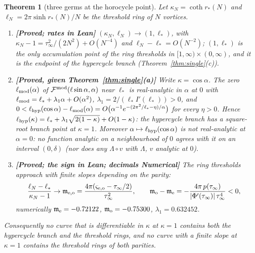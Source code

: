 \documentclass[11pt]{article}
\newtheorem{theorem}{Theorem}[section]
\theoremstyle{definition}
\theoremstyle{remark}
\newcommand{\st}[1]{\textbf{[#1]}}
\begin{document}
\begin{theorem}[three germs at the horocycle point]\label{thm:corner}
Let $\kappa_N=\coth r_*(N)$ and $\ell_N=2\pi\sinh r_*(N)/N$ be the threshold ring of $N$ vortices.
\begin{enumerate}
\item[(a)] \st{Proved; rates in Lean} $(\kappa_N,\ell_N)\to(1,\ell_*)$, with $\kappa_N-1=\tau_\infty^2/(2N^2)+O(N^{-4})$ and
$\ell_N-\ell_*=O(N^{-2})$; $(1,\ell_*)$ is the only accumulation point of the ring thresholds in $[1,\infty)\times(0,\infty)$, and it is
the endpoint of the hypercycle branch (Theorem~\ref{thm:single}(c)).
\item[(b)] \st{Proved, given Theorem~\ref{thm:single}(a)} Write $\kappa=\cos\alpha$. The zero $\ell_{\rm mod}(\alpha)$ of
$\mathcal F^{\rm mod}(\ell\sin\alpha,\alpha)$ near $\ell_*$ is real-analytic in $\alpha$ at $0$ with
$\ell_{\rm mod}=\ell_*+\lambda_1\alpha+O(\alpha^2)$, $\lambda_1=2/(\ell_*I'(\ell_*))>0$, and
$0<\ell_{\rm hyp}(\cos\alpha)-\ell_{\rm mod}(\alpha)=O\big(\alpha^{-1}e^{-(2\pi^2/\ell_*-\eta)/\alpha}\big)$ for every $\eta>0$. Hence
$\ell_{\rm hyp}(\kappa)=\ell_*+\lambda_1\sqrt{2(1-\kappa)}+O(1-\kappa)$: the hypercycle branch has a square-root branch point at $\kappa=1$.
Moreover $\alpha\mapsto\ell_{\rm hyp}(\cos\alpha)$ is not real-analytic at $\alpha=0$: no function analytic on a neighbourhood of $0$
agrees with it on an interval $(0,\delta)$ (nor does any $\Lambda\circ v$ with $\Lambda$, $v$ analytic at $0$).
\item[(c)] \st{Proved; the sign in Lean; decimals Numerical} The ring thresholds approach with finite slopes depending on the
parity:
\[
\frac{\ell_N-\ell_*}{\kappa_N-1}\to \mathfrak m_{\rm e,o}=\frac{4\pi(\varsigma_{\rm e,o}-\tau_\infty/2)}{\tau_\infty^2},\qquad
\mathfrak m_{\rm o}-\mathfrak m_{\rm e}=-\frac{4\pi\,p(\tau_\infty)}{|\Phi'(\tau_\infty)|\,\tau_\infty^4}<0,
\]
numerically $\mathfrak m_{\rm e}=-0.72122$, $\mathfrak m_{\rm o}=-0.75300$, $\lambda_1=0.632452$.
\end{enumerate}
Consequently no curve that is differentiable in $\kappa$ at $\kappa=1$ contains both the hypercycle branch and the threshold rings,
and no curve with a finite slope at $\kappa=1$ contains the threshold rings of both parities.
\end{theorem}
\end{document}
